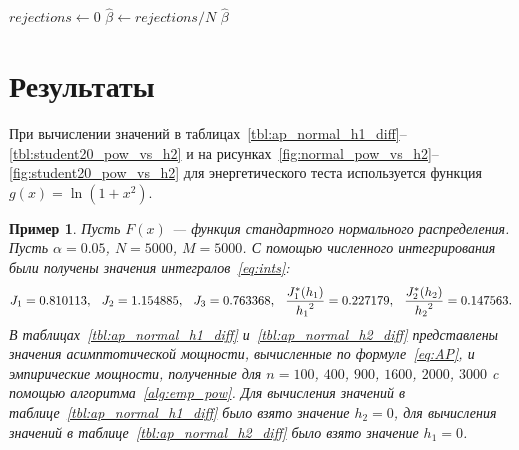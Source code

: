 \documentclass[12pt]{article}
\theoremstyle{break}
\newtheorem{example}{Пример}
\begin{document}
\vspace{0.3in}

\begin{algorithm}[H]
	\caption{Оценка эмпирической мощности критерия $\hat{\beta}$}
	\label{alg:emp_pow}
	
	$rejections \leftarrow 0$\;
	$\hat{\beta} \leftarrow rejections / N$\;
	\Return $\hat{\beta}$\;

\end{algorithm}



\newpage
\section{Результаты}
При вычислении значений в таблицах~\ref{tbl:ap_normal_h1_diff}--\ref{tbl:student20_pow_vs_h2} и на
рисунках~\ref{fig:normal_pow_vs_h2}--\ref{fig:student20_pow_vs_h2}  для энергетического теста используется функция $g(x) = \ln(1+x^2)$.

\begin{example}
Пусть $F(x)$ --- функция стандартного нормального распределения. Пусть $\alpha = 0.05$, $N=5000$, $M=5000$.
С помощью численного интегрирования были получены значения интегралов~\eqref{eq:ints}:
\begin{equation*}
	J_1 = 0.810113, \hspace{0.1in} J_2 = 1.154885, \hspace{0.1in}  J_3=0.763368, \hspace{0.1in}
	\frac{J^{*}_1(h_1)}{{h_1}^2} = 0.227179,   \hspace{0.1in} \frac{J^{*}_2(h_2)}{{h_2}^2} = 0.147563.
\end{equation*}
В таблицах~\ref{tbl:ap_normal_h1_diff} и~\ref{tbl:ap_normal_h2_diff} представлены значения асимптотической мощности, вычисленные по формуле~\eqref{eq:AP},
и эмпирические мощности, полученные для $n = 100$, $400$, $900$, $1600$, $2000$, $3000$ c помощью алгоритма~\ref{alg:emp_pow}.
Для вычисления значений в таблице~\ref{tbl:ap_normal_h1_diff} было взято значение $h_2=0$, для вычисления значений  в таблице~\ref{tbl:ap_normal_h2_diff} было взято значение $h_1=0$.
\end{example}
\end{document}
